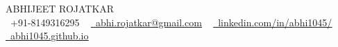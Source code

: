 \documentclass[letterpaper,11pt]{article}
\begin{document}
\begin{center}
    {\Huge \scshape ABHIJEET ROJATKAR} \\ \vspace{1pt}
    \small \raisebox{-0.1\height}\faPhone\ +91-8149316295 ~ \href{mailto:abhi.rojatkar@gmail.com}{\raisebox{-0.2\height}\faEnvelope\  \underline{abhi.rojatkar@gmail.com}} ~
    \href{https://www.linkedin.com/in/abhi1045/}{\raisebox{-0.2\height}\faLinkedin\ \underline{linkedin.com/in/abhi1045/}}  ~
    \href{https://www.abhi1045.github.io}{\raisebox{-0.2\height}\faGithub\ \underline{abhi1045.github.io}}
    \vspace{-8pt}
\end{center}




\end{document}
